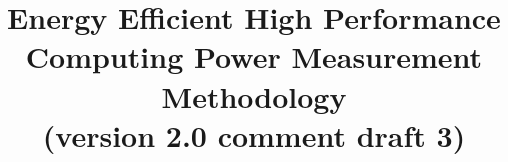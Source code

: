 \documentclass[runningheads]{scrreprt}
\begin{document}
\graphicspath{{figures/}}

\pagestyle{headings}  %

\title{
Energy Efficient High Performance Computing Power Measurement Methodology \\
\bigskip
\normalsize{(version 2.0 comment draft 3)}
}


\date{ }
\maketitle              %

\tableofcontents
\listoftables
\listoffigures

\newcommand{\SpecRateLThreeAC}{5~kHz}
\newcommand{\SpecRateLThreeDC}{120~Hz}
\newcommand{\SpecAccuracyLThree}{1\%}
\newcommand{\SpecAccuracyLTwo}{2\%}
\newcommand{\SpecAccuracyLOne}{5\%}
\newcommand{\SpecAccuracyMeter}{3\%}
\newcommand{\SpecPowerMinLOne}{2~kW}
\newcommand{\SpecPowerMinLTwo}{10~kW}
\newcommand{\SpecPowerMaxLOne}{40~kW}
\newcommand{\SpecFracMinLOne}{$\frac{1}{10}$}
\newcommand{\SpecFracMinLTwo}{$\frac{1}{8}$}
\newcommand{\SpecMinNodes}{15}
\newcommand{\MinMeasurementsCorePhaseLTwoThree}{10}
\newcommand{\MaxReadingIntervalCorePhaseLTwoThree}{10\%}
\newcommand{\MaxSecMissingLThree}{10}
\newcommand{\MaxSecMissingLThreeHalf}{5} %

%



\newpage




\end{document}

